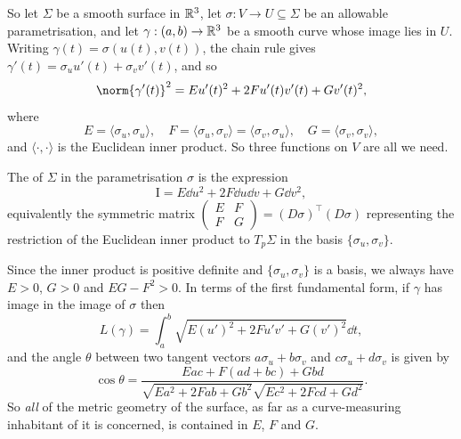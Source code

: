 \documentclass[a4paper]{scrartcl}
\begin{document}
So let $\Sigma$ be a smooth surface in $\mathbb{R}^3$, let $\sigma: V \rightarrow U \subseteq \Sigma$ be an allowable parametrisation, and let $\gamma: (a, b) \rightarrow \mathbb{R}^3$ be a smooth curve whose image lies in $U$. Writing $\gamma(t) = \sigma(u(t), v(t))$, the chain rule gives $\gamma'(t) = \sigma_u u'(t) + \sigma_v v'(t)$, and so
$$
\norm{\gamma'(t)}^2 = E u'(t)^2 + 2F u'(t) v'(t) + Gv'(t)^2,
$$
where
$$
E = \langle \sigma_u, \sigma_u\rangle, \quad F = \langle \sigma_u, \sigma_v \rangle = \langle \sigma_v, \sigma_u \rangle, \quad G = \langle \sigma_v, \sigma_v \rangle,
$$
and $\langle \cdot, \cdot \rangle$ is the Euclidean inner product. So three functions on $V$ are all we need.

\begin{definition}
    The  of $\Sigma$ in the parametrisation $\sigma$ is the expression
    $$
    \mathrm{I} = E \dd u^2 + 2F \dd u \dd v + G \dd v^2,
    $$
    equivalently the symmetric matrix $\begin{pmatrix} E & F \\ F & G\end{pmatrix} = (D\sigma)^\top (D\sigma)$ representing the restriction of the Euclidean inner product to $T_p\Sigma$ in the basis $\{\sigma_u, \sigma_v\}$.
\end{definition}

Since the inner product is positive definite and $\{\sigma_u, \sigma_v\}$ is a basis, we always have $E > 0$, $G > 0$ and $EG - F^2 > 0$. In terms of the first fundamental form, if $\gamma$ has image in the image of $\sigma$ then
$$
L(\gamma) = \int_a^b \sqrt{E (u')^2 + 2F u' v' + G(v')^2} \dd t,
$$
and the angle $\theta$ between two tangent vectors $a\sigma_u + b\sigma_v$ and $c\sigma_u + d\sigma_v$ is given by
$$
\cos\theta = \frac{Eac + F(ad+bc) + Gbd}{\sqrt{Ea^2 + 2Fab+Gb^2}\sqrt{Ec^2+2Fcd+Gd^2}}.
$$
So \emph{all} of the metric geometry of the surface, as far as a curve-measuring inhabitant of it is concerned, is contained in $E$, $F$ and $G$.
\end{document}
